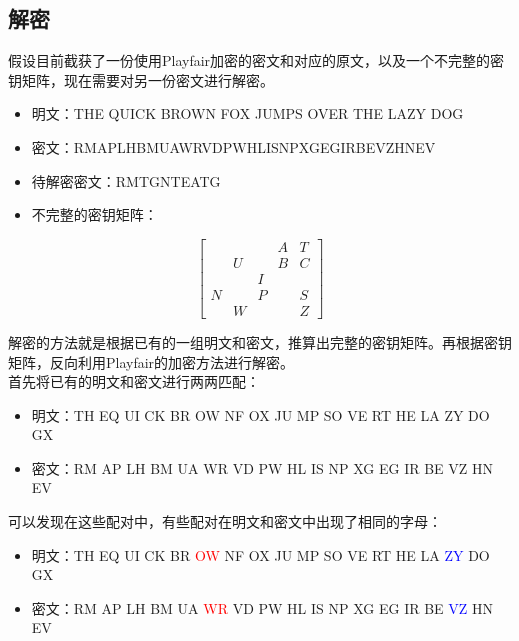 \subsection{解密}

假设目前截获了一份使用Playfair加密的密文和对应的原文，以及一个不完整的密钥矩阵，现在需要对另一份密文进行解密。

\begin{itemize}
    \item 明文：THE QUICK BROWN FOX JUMPS OVER THE LAZY DOG
    \item 密文：RMAPLHBMUAWRVDPWHLISNPXGEGIRBEVZHNEV
    \item 待解密密文：RMTGNTEATG
    \item 不完整的密钥矩阵：
\end{itemize}

\[
    \begin{bmatrix}
          &   &   & A & T \\
          & U &   & B & C \\
          &   & I &   &   \\
        N &   & P &   & S \\
          & W &   &   & Z
    \end{bmatrix}
\]

\vspace{0.5cm}

解密的方法就是根据已有的一组明文和密文，推算出完整的密钥矩阵。再根据密钥矩阵，反向利用Playfair的加密方法进行解密。\\

首先将已有的明文和密文进行两两匹配：

\begin{itemize}
    \item 明文：TH EQ UI CK BR OW NF OX JU MP SO VE RT HE LA ZY DO GX
    \item 密文：RM AP LH BM UA WR VD PW HL IS NP XG EG IR BE VZ HN EV
\end{itemize}

可以发现在这些配对中，有些配对在明文和密文中出现了相同的字母：

\begin{itemize}
    \item 明文：TH EQ UI CK BR \textcolor{red}{OW} NF OX JU MP SO VE RT HE LA \textcolor{blue}{ZY} DO GX
    \item 密文：RM AP LH BM UA \textcolor{red}{WR} VD PW HL IS NP XG EG IR BE \textcolor{blue}{VZ} HN EV
\end{itemize}

